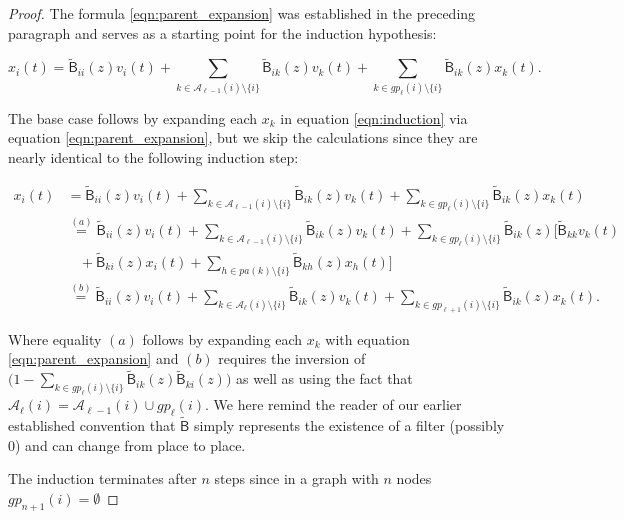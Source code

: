 \documentclass[12pt]{article}
\def\B{\mathsf{B}}  %
\def\wtB{\widetilde{\B}}  %
\newcommand{\pa}[1]{pa(#1)}  %
\newcommand{\ancn}[2]{\mathcal{A}_{#1}(#2)}  %
\newcommand{\gpn}[2]{gp_{#1}(#2)}  %
\begin{document}
\begin{proof}
  The formula \ref{eqn:parent_expansion} was established in the
  preceding paragraph and serves as a starting point for the induction
  hypothesis:

  \begin{equation}
    \label{eqn:induction}
    x_i(t) = \wtB_{ii}(z)v_i(t) + \sum_{k \in \ancn{\ell - 1}{i}\setminus \{i\}}\wtB_{ik}(z)v_k(t) + \sum_{k \in \gpn{\ell}{i} \setminus \{i\}}\wtB_{ik}(z)x_k(t).
  \end{equation}

  The base case follows by expanding each $x_k$ in equation \ref{eqn:induction} via equation \ref{eqn:parent_expansion}, but we skip the calculations since they are nearly identical to the following induction step:

  \begin{align*}
    x_i(t) &= \wtB_{ii}(z)v_i(t) + \sum_{k \in \ancn{\ell - 1}{i}\setminus \{i\}}\wtB_{ik}(z)v_k(t) + \sum_{k \in \gpn{\ell}{i} \setminus \{i\}}\wtB_{ik}(z)x_k(t)\\
           &\overset{(a)}{=} \wtB_{ii}(z)v_i(t) + \sum_{k \in \ancn{\ell - 1}{i}\setminus \{i\}}\wtB_{ik}(z)v_k(t) + \sum_{k \in \gpn{\ell}{i} \setminus \{i\}}\wtB_{ik}(z)\big[\wtB_{kk}v_k(t)\\
    &\ \ \ \  + \wtB_{ki}(z)x_i(t) + \sum_{h \in \pa{k}\setminus \{i\}}\wtB_{kh}(z)x_h(t)\big]\\
    &\overset{(b)}{=} \wtB_{ii}(z)v_i(t) + \sum_{k \in \ancn{\ell}{i} \setminus \{i\}}\wtB_{ik}(z)v_k(t) + \sum_{k \in \gpn{\ell + 1}{i} \setminus \{i\}}\wtB_{ik}(z)x_k(t).
  \end{align*}

  Where equality $(a)$ follows by expanding each $x_k$ with equation \ref{eqn:parent_expansion} and $(b)$ requires the inversion of $\big(1 - \sum_{k \in \gpn{\ell}{i}\setminus\{i\}}\wtB_{ik}(z)\wtB_{ki}(z)\big)$ as well as using the fact that $\ancn{\ell}{i} = \ancn{\ell - 1}{i}\cup\gpn{\ell}{i}$.  We here remind the reader of our earlier established convention that $\wtB$ simply represents the existence of a filter (possibly 0) and can change from place to place.

The induction terminates after $n$ steps since in a graph with $n$ nodes $\gpn{n + 1}{i} = \emptyset$




\end{proof}
\end{document}
